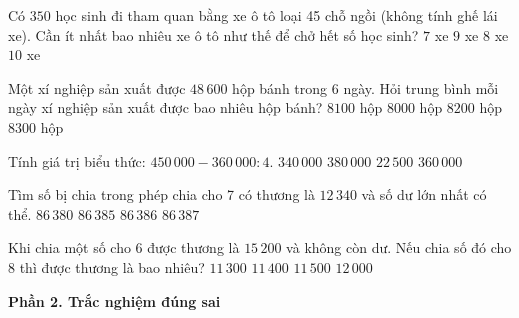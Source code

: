 \begin{ex} %
Có $350$ học sinh đi tham quan bằng xe ô tô loại 45 chỗ ngồi (không tính ghế lái xe). Cần ít nhất bao nhiêu xe ô tô như thế để chở hết số học sinh?
\choice
{$7$ xe}
{$9$ xe}
{\True $8$ xe}
{$10$ xe}
\end{ex}

\begin{ex} %
Một xí nghiệp sản xuất được $48\,600$ hộp bánh trong 6 ngày. Hỏi trung bình mỗi ngày xí nghiệp sản xuất được bao nhiêu hộp bánh?
\choice
{\True $8100$ hộp}
{$8000$ hộp}
{$8200$ hộp}
{$8300$ hộp}
\end{ex}

\begin{ex} %
Tính giá trị biểu thức: $450\,000 - 360\,000 : 4$.
\choice
{$340\,000$}
{$380\,000$}
{$22\,500$}
{\True $360\,000$}
\end{ex}

\begin{ex} %
Tìm số bị chia trong phép chia cho 7 có thương là $12\,340$ và số dư lớn nhất có thể.
\choice
{$86\,380$}
{$86\,385$}
{\True $86\,386$}
{$86\,387$}
\end{ex}

\begin{ex} %
Khi chia một số cho 6 được thương là $15\,200$ và không còn dư. Nếu chia số đó cho 8 thì được thương là bao nhiêu?
\choice
{$11\,300$}
{\True $11\,400$}
{$11\,500$}
{$12\,000$}
\end{ex}

\textbf{Phần 2. Trắc nghiệm đúng sai}

